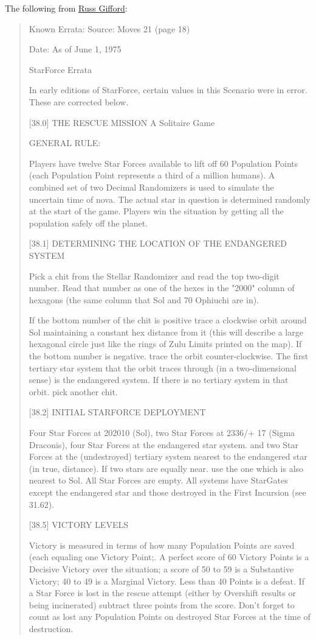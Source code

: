 \documentclass[10pt]{article}
\begin{document}
The following from \href{http://www.russgifford.net/db_pages/game_starforce.htm}{Russ Gifford}:

\begin{quote}
Known Errata:
Source: Moves 21 (page 18)

Date: As of June 1, 1975

StarForce Errata

In early editions of StarForce, certain values in this Scenario were in error.
These are corrected below.

[38.0] THE RESCUE MISSION
A Solitaire Game

GENERAL RULE:

Players have twelve Star Forces available to lift off 60 Population Points
(each Population Point represents a third of a million humans). A combined set
of two Decimal Randomizers is used to simulate the uncertain time of nova. The
actual star in question is determined randomly at the start of the game.
Players win the situation by getting all the population safely off the planet.

[38.1] DETERMINING THE LOCATION OF THE ENDANGERED SYSTEM

Pick a chit from the Stellar Randomizer and read the top two-digit number. Read
that number as one of the hexes in the "2000" column of hexagons (the same
column that Sol and 70 Ophiuchi are in).

If the bottom number of the chit is positive trace a clockwise orbit around Sol
maintaining a constant hex distance from it (this will describe a large
hexagonal circle just like the rings of Zulu Limits printed on the map). If the
bottom number is negative. trace the orbit counter-clockwise. The first
tertiary star system that the orbit traces through (in a two-dimensional sense)
is the endangered system. If there is no tertiary system in that orbit. pick
another chit.

[38.2] INITIAL STARFORCE DEPLOYMENT

Four Star Forces at 202010 (Sol), two Star Forces at 2336/+ 17 (Sigma
Draconis), four Star Forces at the endangered star system. and two Star Forces
at the (undestroyed) tertiary system nearest to the endangered star (in true,
distance). If two stars are equally near. use the one which is also nearest to
Sol. All Star Forces are empty. All systems have StarGates except the
endangered star and those destroyed in the First Incursion (see 31.62).

[38.5] VICTORY LEVELS

Victory is measured in terms of how many Population Points are saved (each
equaling one Victory Point;. A perfect score of 60 Victory Points is a Decisive
Victory over the situation; a score of 50 to 59 is a Substantive Victory; 40 to
49 is a Marginal Victory. Less than 40 Points is a defeat. If a Star Force is
lost in the rescue attempt (either by Overshift results or being incinerated)
subtract three points from the score. Don't forget to count as lost any
Population Points on destroyed Star Forces at the time of destruction.
\end{quote}
\end{document}
